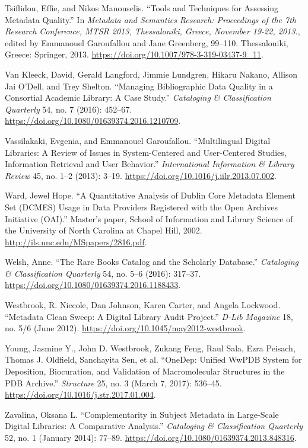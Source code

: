 Tsiflidou, Effie, and Nikos Manouselis. “Tools and Techniques for Assessing Metadata Quality.” In \emph{Metadata and Semantics Research: Proceedings of the 7th Research Conference, MTSR 2013, Thessaloniki, Greece, November 19-22, 2013.}, edited by Emmanouel Garoufallou and Jane Greenberg, 99–110. Thessaloniki, Greece: Springer, 2013. \url{https://doi.org/10.1007/978-3-319-03437-9_11}.

Van Kleeck, David, Gerald Langford, Jimmie Lundgren, Hikaru Nakano, Allison Jai O’Dell, and Trey Shelton. “Managing Bibliographic Data Quality in a Consortial Academic Library: A Case Study.” \emph{Cataloging \& Classification Quarterly} 54, no. 7 (2016): 452–67. \url{https://doi.org/10.1080/01639374.2016.1210709}.

Vassilakaki, Evgenia, and Emmanouel Garoufallou. “Multilingual Digital Libraries: A Review of Issues in System-Centered and User-Centered Studies, Information Retrieval and User Behavior.” \emph{International Information \& Library Review} 45, no. 1–2 (2013): 3–19. \url{https://doi.org/10.1016/j.iilr.2013.07.002}.

Ward, Jewel Hope. “A Quantitative Analysis of Dublin Core Metadata Element Set (DCMES) Usage in Data Providers Registered with the Open Archives Initiative (OAI).” Master’s paper, School of Information and Library Science of the University of North Carolina at Chapel Hill, 2002. \url{http://ils.unc.edu/MSpapers/2816.pdf}.

Welsh, Anne. “The Rare Books Catalog and the Scholarly Database.” \emph{Cataloging \& Classification Quarterly} 54, no. 5–6 (2016): 317–37. \url{https://doi.org/10.1080/01639374.2016.1188433}.

Westbrook, R. Niccole, Dan Johnson, Karen Carter, and Angela Lockwood. “Metadata Clean Sweep: A Digital Library Audit Project.” \emph{D-Lib Magazine} 18, no. 5/6 (June 2012). \url{https://doi.org/10.1045/may2012-westbrook}.

Young, Jasmine Y., John D. Westbrook, Zukang Feng, Raul Sala, Ezra Peisach, Thomas J. Oldfield, Sanchayita Sen, et al. “OneDep: Unified WwPDB System for Deposition, Biocuration, and Validation of Macromolecular Structures in the PDB Archive.” \emph{Structure} 25, no. 3 (March 7, 2017): 536–45. \url{https://doi.org/10.1016/j.str.2017.01.004}.

Zavalina, Oksana L. “Complementarity in Subject Metadata in Large-Scale Digital Libraries: A Comparative Analysis.” \emph{Cataloging \& Classification Quarterly} 52, no. 1 (January 2014): 77–89. \url{https://doi.org/10.1080/01639374.2013.848316}.

